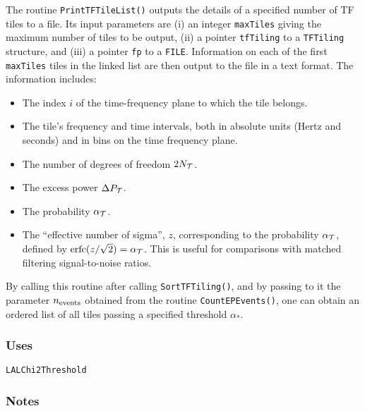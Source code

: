 The routine \verb+PrintTFTileList()+ outputs the details of a specified number
of TF tiles to a file.  Its input parameters are (i) an integer
\verb+maxTiles+ giving the maximum number of tiles to be output, (ii) a
pointer \verb+tfTiling+ to a \verb+TFTiling+ structure, and (iii) a pointer
\verb+fp+ to a \verb+FILE+.  Information on each of the first \verb+maxTiles+
tiles in the linked list are then output to the file in a text format.  The
information includes:
\begin{itemize}

\item The index $i$ of the time-frequency plane
to which the tile belongs.

\item The tile's frequency and time intervals, both in absolute units
(Hertz and seconds) and in bins on the time frequency plane.

\item The number of degrees of freedom $2 N_{\cal T}$.

\item The excess power $\Delta P_{\cal T}$.

\item The probability $\alpha_{\cal T}$.  

\item The ``effective number of sigma'', $z$, corresponding to the
probability $\alpha_{\cal T}$, defined by ${\rm erfc}(z/\sqrt{2}) =
\alpha_{\cal T}$.  This is useful for comparisons with matched
filtering signal-to-noise ratios.

\end{itemize}

By calling this routine after calling \verb+SortTFTiling()+, and by
passing to it the parameter $n_{\rm events}$ obtained from the routine
\verb+CountEPEvents()+, one can obtain an ordered list of all tiles
passing a specified threshold $\alpha_*$.

\subsubsection*{Uses}
\begin{verbatim}
LALChi2Threshold 
\end{verbatim}

\subsubsection*{Notes}

\vfill{\footnotesize}

